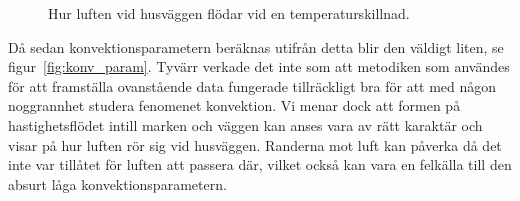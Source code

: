 \begin{figure}[hpbt]
\begin{center}
\caption{\label{fig:velocityfield} Hur luften vid husväggen flödar vid en temperaturskillnad.}
\end{center}
\end{figure}


Då sedan konvektionsparametern beräknas utifrån detta blir den väldigt liten,
se figur~\ref{fig:konv_param}. Tyvärr verkade det inte som att metodiken som användes
för att framställa ovanstående data fungerade tillräckligt bra för att med någon
noggrannhet studera fenomenet konvektion. Vi menar dock att formen på hastighetsflödet intill marken och väggen
kan anses vara av rätt karaktär och visar på hur luften rör sig vid husväggen. Randerna mot
luft kan påverka då det inte var tillåtet för luften att passera där, vilket också kan vara en felkälla till den absurt låga konvektionsparametern.

